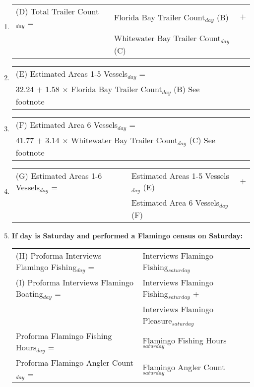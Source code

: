 \documentclass[letterpaper,12pt]{article}
\newcommand{\hspacer}{\hspace*{1cm}}
\begin{document}
\begin{enumerate}

\item
\begin{tabular}{l@{ }l@{ }l}
	(D) Total Trailer Count$_{day}$ =
		& Florida Bay Trailer Count$_{day}$ (B) & $+$ \\
		& Whitewater Bay Trailer Count$_{day}$ (C)
\end{tabular}

\item
\begin{tabular}{l@{ }l@{ }l}
	(E) Estimated Areas 1-5 Vessels$_{day}$ = \\
		\hspacer 32.24 $+$
		1.58 $\times$ Florida Bay Trailer Count$_{day}$ (B) See footnote \footnotemark[2]
\end{tabular}

\item
\begin{tabular}{l@{ }l@{ }l}
	(F) Estimated Area 6 Vessels$_{day}$ = \\
		\hspacer 41.77 $+$
		3.14 $\times$ Whitewater Bay Trailer Count$_{day}$ (C) See footnote \footnotemark[2]
\end{tabular}

\item
\begin{tabular}{l@{ }l@{ }l}
	(G) Estimated Areas 1-6 Vessels$_{day}$ =
		& Estimated Areas 1-5 Vessels$_{day}$ (E) & $+$ \\
		& Estimated Area 6 Vessels$_{day}$ (F)
\end{tabular}

\item
\textbf{If day is Saturday and performed a Flamingo census on Saturday:} \\
\begin{tabular}{l@{ }l@{ }l}
	(H) Proforma Interviews Flamingo Fishing$_{day}$ =
		& Interviews Flamingo Fishing$_{saturday}$ \\

	(I) Proforma Interviews Flamingo Boating$_{day}$ =
		& Interviews Flamingo Fishing$_{saturday}$ $+$ \\
		& Interviews Flamingo Pleasure$_{saturday}$ \\

	Proforma Flamingo Fishing Hours$_{day}$ =
		& Flamingo Fishing Hours$_{saturday}$ \\

	Proforma Flamingo Angler Count$_{day}$ =
		& Flamingo Angler Count$_{saturday}$ \\
\end{tabular}


\end{enumerate}
\end{document}
